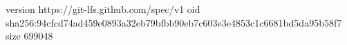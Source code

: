 version https://git-lfs.github.com/spec/v1
oid sha256:94cfcd74ad459e0893a32eb79bfbb90eb7c603e3e4853c1c6681bd5da95b58f7
size 699048
